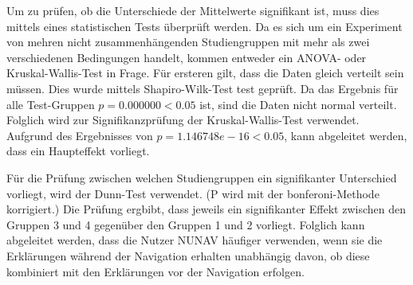 Um zu prüfen, ob die Unterschiede der Mittelwerte signifikant ist, muss dies mittels eines statistischen Tests überprüft werden. Da es sich um ein Experiment von mehren nicht zusammenhängenden Studiengruppen mit mehr als zwei verschiedenen Bedingungen handelt, kommen entweder ein ANOVA- oder Kruskal-Wallis-Test in Frage. Für ersteren gilt, dass die Daten gleich verteilt sein müssen. Dies wurde mittels Shapiro-Wilk-Test test geprüft. Da das Ergebnis für alle Test-Gruppen $ p = 0.000000 < 0.05 $ ist, sind die Daten nicht normal verteilt. Folglich wird zur Signifikanzprüfung der Kruskal-Wallis-Test verwendet. Aufgrund des Ergebnisses von $ p = 1.146748e-16 < 0.05 $, kann abgeleitet werden, dass ein Haupteffekt vorliegt.

Für die Prüfung zwischen welchen Studiengruppen ein signifikanter Unterschied vorliegt, wird der Dunn-Test \cite{dunn1964multiple} verwendet. (P wird mit der \glqq bonferoni\grqq{}-Methode korrigiert.) Die Prüfung ergbibt, dass jeweils ein signifikanter Effekt zwischen den Gruppen 3 und 4 gegenüber den Gruppen 1 und 2 vorliegt. Folglich kann abgeleitet werden, dass die Nutzer NUNAV häufiger verwenden, wenn sie die Erklärungen während der Navigation erhalten unabhängig davon, ob diese kombiniert mit den Erklärungen vor der Navigation erfolgen.